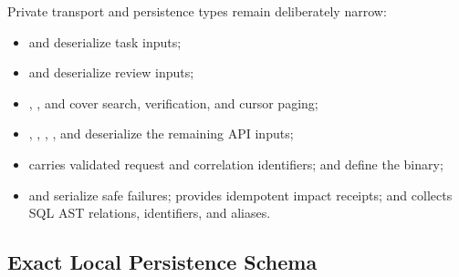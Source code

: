 Private transport and persistence types remain deliberately narrow:
\begin{itemize}
  \item {} and  deserialize task inputs;
  \item {} and  deserialize review inputs;
  \item {}, , and  cover search, verification, and cursor paging;
  \item {}, , , , and  deserialize the remaining API inputs;
  \item {} carries validated request and correlation identifiers;  and  define the binary;
  \item {} and  serialize safe failures;  provides idempotent impact receipts; and  collects SQL AST relations, identifiers, and aliases.
\end{itemize}

\subsection{Exact Local Persistence Schema}

